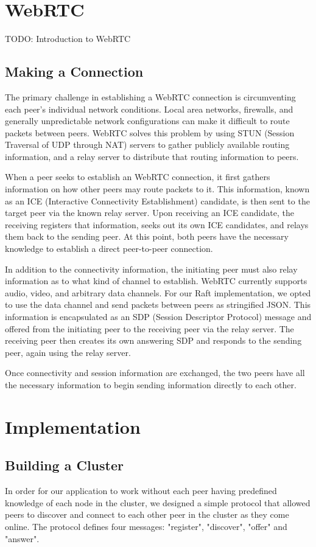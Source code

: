 \documentclass[11pt,twocolumn]{article}
\begin{document}
\section{WebRTC}
TODO: Introduction to WebRTC
\subsection{Making a Connection}
The primary challenge in establishing a WebRTC connection is circumventing each peer's individual network conditions. Local area networks, firewalls, and generally unpredictable network configurations can make it difficult to route packets between peers. WebRTC solves this problem by using STUN (Session Traversal of UDP through NAT) servers to gather publicly available routing information, and a relay server to distribute that routing information to peers.

When a peer seeks to establish an WebRTC connection, it first gathers information on how other peers may route packets to it. This information, known as an ICE (Interactive Connectivity Establishment) candidate, is then sent to the target peer via the known relay server. Upon receiving an ICE candidate, the receiving registers that information, seeks out its own ICE candidates, and relays them back to the sending peer. At this point, both peers have the necessary knowledge to establish a direct peer-to-peer connection.

In addition to the connectivity information, the initiating peer must also relay information as to what kind of channel to establish. WebRTC currently supports audio, video, and arbitrary data channels. For our Raft implementation, we opted to use the data channel and send packets between peers as stringified JSON. This information is encapsulated as an SDP (Session Descriptor Protocol) message and offered from the initiating peer to the receiving peer via the relay server. The receiving peer then creates its own answering SDP and responds to the sending peer, again using the relay server.

Once connectivity and session information are exchanged, the two peers have all the necessary information to begin sending information directly to each other.

\section{Implementation}

\subsection{Building a Cluster}
In order for our application to work without each peer having predefined knowledge of each node in the cluster, we designed a simple protocol that allowed peers to discover and connect to each other peer in the cluster as they come online. The protocol defines four messages: "register", "discover", "offer" and "answer".
\end{document}
